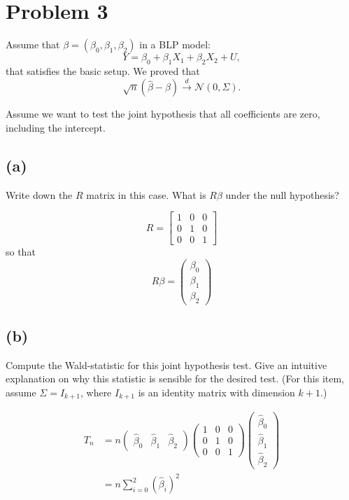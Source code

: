 \documentclass[11pt]{article}
\begin{document}
\newpage

\section*{Problem 3}

Assume that \( \beta = (\beta_0, \beta_1, \beta_2) \) in a BLP model:
\[
Y = \beta_0 + \beta_1 X_1 + \beta_2 X_2 + U,
\]
that satisfies the basic setup. We proved that
\[
\sqrt{n}(\hat{\beta} - \beta) \xrightarrow{d} \mathcal{N}(0, \Sigma).
\]

Assume we want to test the joint hypothesis that all coefficients are zero, including the intercept.

\subsection*{(a)}

Write down the \( R \) matrix in this case. What is \( R\beta \) under the null hypothesis?
\begin{solution}
    \[R = \begin{bmatrix}
        1 & 0 &0\\
        0 & 1 & 0\\
        0 & 0 &1
    \end{bmatrix}\] so that 
    \[R\beta = \begin{pmatrix}
        \beta_0\\
    \beta_1\\\beta_2
    \end{pmatrix}\]
\end{solution}

\subsection*{(b)}

Compute the Wald-statistic for this joint hypothesis test. Give an intuitive explanation on why this statistic is sensible for the desired test. (For this item, assume \( \Sigma = I_{k+1} \), where \( I_{k+1} \) is an identity matrix with dimension \( k+1 \).)

\begin{solution}
    
\begin{align*}
    T_n &= n\begin{pmatrix}
        \hat{\beta}_0 & \hat{\beta}_1 &\hat{\beta}_2
    \end{pmatrix} \begin{pmatrix}
        1 & 0 & 0 \\
        0 & 1 & 0\\
        0 & 0 &1
    \end{pmatrix}\begin{pmatrix}
        \hat{\beta}_0 \\ \hat{\beta}_1 \\\hat{\beta}_2
    \end{pmatrix}\\
    &= n \sum_{i=0}^2 ( \hat \beta_i)^2
\end{align*}
\end{solution}
\end{document}
